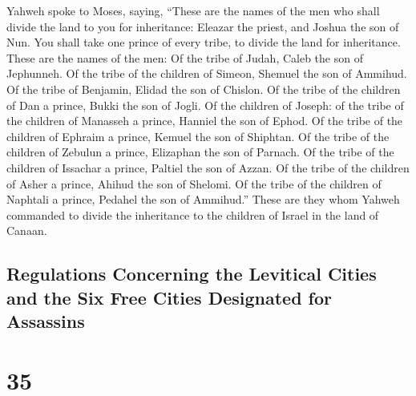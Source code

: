 Yahweh spoke to Moses, saying,  ``These
are the names of the men who shall divide the land to you for
inheritance: Eleazar the priest, and Joshua the son of Nun.
 You shall take one prince of every tribe, to divide the
land for inheritance.  These are the names of the men: Of
the tribe of Judah, Caleb the son of Jephunneh.  Of the
tribe of the children of Simeon, Shemuel the son of Ammihud.
 Of the tribe of Benjamin, Elidad the son of Chislon.
 Of the tribe of the children of Dan a prince, Bukki the
son of Jogli.  Of the children of Joseph: of the tribe of
the children of Manasseh a prince, Hanniel the son of Ephod.
 Of the tribe of the children of Ephraim a prince, Kemuel
the son of Shiphtan.  Of the tribe of the children of
Zebulun a prince, Elizaphan the son of Parnach.  Of the
tribe of the children of Issachar a prince, Paltiel the son of Azzan.
 Of the tribe of the children of Asher a prince, Ahihud
the son of Shelomi.  Of the tribe of the children of
Naphtali a prince, Pedahel the son of Ammihud.''  These
are they whom Yahweh commanded to divide the inheritance to the children
of Israel in the land of Canaan.

\hypertarget{regulations-concerning-the-levitical-cities-and-the-six-free-cities-designated-for-assassins}{%
\subsection{Regulations Concerning the Levitical Cities and the Six Free
Cities Designated for
Assassins}\label{regulations-concerning-the-levitical-cities-and-the-six-free-cities-designated-for-assassins}}

\hypertarget{section-34}{%
\section{35}\label{section-34}}

